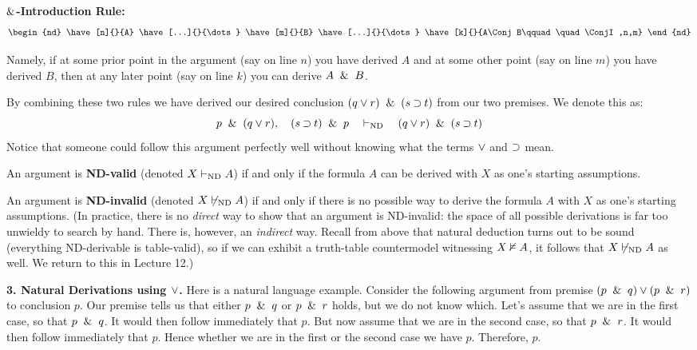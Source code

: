 \documentclass[options]{philosophersimprint}
\begin{document}
\begin{center}
\begin{minipage}[t]{0.25\textwidth}
\textbf{$\mathbin{\&}$-Introduction Rule:}
\vspace{-0.5cm}
\begin{align*}
     \begin{nd}
        \have[n]{}{A}
        \have[...]{}{\dots}
        \have[m]{}{B}
        \have[...]{}{\dots}
        \have[k]{}{A\Conj B\qquad\quad \ConjI,n,m}
    \end{nd}
\end{align*}
\end{minipage}
\hfill
\begin{minipage}[t]{0.19\textwidth}
Namely, if at some prior point in the argument (say on line $n$) you have derived $A$ and at some other point (say on line $m$) you have derived $B$, then at any later point (say on line $k$) you can derive $A \ \mathbin{\&} \  B$.
\end{minipage}
\end{center}

By combining these two rules we have derived our desired conclusion $(q \mathbin{\vee} r) \ \mathbin{\&} \  (s \mathbin{\supset} t)$ from our two premises. We denote this as:
$$p \ \mathbin{\&} \  (q \mathbin{\vee} r),\quad (s \mathbin{\supset} t)\ \mathbin{\&} \  p \quad \vdash_{\mathrm{ND}} \quad (q \mathbin{\vee} r) \ \mathbin{\&} \  (s \mathbin{\supset} t)$$
Notice that someone could follow this argument perfectly well without knowing what the terms $\mathbin{\vee}$ and $\mathbin{\supset}$ mean.

An argument is \textbf{ND-valid} (denoted $X\vdash_{\mathrm{ND}} A$) if and only if the formula $A$ can be derived with $X$ as one's starting assumptions.

An argument is \textbf{ND-invalid} (denoted $X\not\vdash_{\mathrm{ND}} A$) if and only if there is no possible way to derive the formula $A$ with $X$ as one's starting assumptions. (In practice, there is no \textit{direct} way to show that an argument is ND-invalid: the space of all possible derivations is far too unwieldy to search by hand. There is, however, an \textit{indirect} way. Recall from above that natural deduction turns out to be sound (everything ND-derivable is table-valid), so if we can exhibit a truth-table countermodel witnessing $X \nvDash A$, it follows that $X \not\vdash_{\mathrm{ND}} A$ as well. We return to this in Lecture 12.)

\textbf{3. Natural Derivations using $\mathbin{\vee}$.} Here is a natural language example. Consider the following argument from premise $(p \ \mathbin{\&} \  q) \mathbin{\vee} (p \ \mathbin{\&} \  r)$ to conclusion $p$. Our premise tells us that either $p \ \mathbin{\&} \  q$ or $p \ \mathbin{\&} \  r$ holds, but we do not know which. Let's assume that we are in the first case, so that $p \ \mathbin{\&} \  q$. It would then follow immediately that $p$. But now assume that we are in the second case, so that $p \ \mathbin{\&} \  r$. It would then follow immediately that $p$. Hence whether we are in the first or the second case we have $p$. Therefore, $p$.
\end{document}
